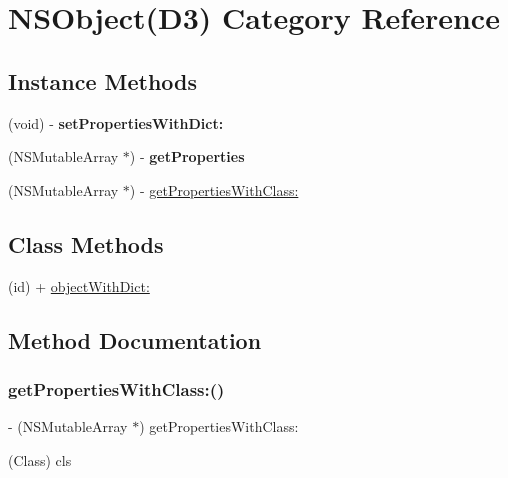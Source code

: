 \hypertarget{category_n_s_object_07_d3_08}{}\section{N\+S\+Object(D3) Category Reference}
\label{category_n_s_object_07_d3_08}
\subsection*{Instance Methods}
\begin{DoxyCompactItemize}
\item 
\mbox{\label{category_n_s_object_07_d3_08_a096f3a1fd2553f087b6a4a2f1f6a12f9}} 
(void) -\/ {\bfseries set\+Properties\+With\+Dict\+:}
\item 
\mbox{\label{category_n_s_object_07_d3_08_a982476d7f4cf5eb0ac4826dffc429658}} 
(N\+S\+Mutable\+Array $\ast$) -\/ {\bfseries get\+Properties}
\item 
(N\+S\+Mutable\+Array $\ast$) -\/ \mbox{\hyperlink{category_n_s_object_07_d3_08_ae6a8d15fef3417d15a741edd6d311d2d}{get\+Properties\+With\+Class\+:}}
\end{DoxyCompactItemize}
\subsection*{Class Methods}
\begin{DoxyCompactItemize}
\item 
(id) + \mbox{\hyperlink{category_n_s_object_07_d3_08_ad95c24f70f30ba209b675410a60a5eab}{object\+With\+Dict\+:}}
\end{DoxyCompactItemize}


\subsection{Method Documentation}
\mbox{\label{category_n_s_object_07_d3_08_ae6a8d15fef3417d15a741edd6d311d2d}} 
\subsubsection{\texorpdfstring{get\+Properties\+With\+Class\+:()}{getPropertiesWithClass:()}}
{\footnotesize\ttfamily -\/ (N\+S\+Mutable\+Array $\ast$) get\+Properties\+With\+Class\+: \begin{DoxyParamCaption}\item[{(Class)}]{cls }\end{DoxyParamCaption}}

